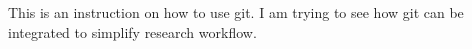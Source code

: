 \documentclass[12pt]{article}
\begin{document}
This is an instruction on how to use git. I am trying to see how git can be integrated to simplify research workflow.
\end{document}
